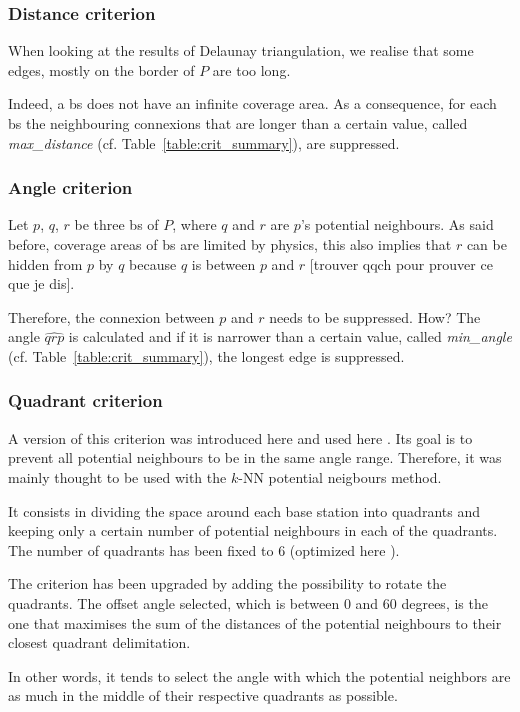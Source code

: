 \documentclass[lettersize,journal,english]{IEEEtran}
\begin{document}
\subsubsection{Distance criterion}
When looking at the results of Delaunay triangulation, we realise that some edges, mostly on the border of $P$ are too long.

Indeed, a \acrshort{bs} does not have an infinite coverage area. As a consequence, for each \acrshort{bs} the neighbouring connexions that are longer than a certain value, called \emph{max\_distance} (cf. Table~\ref{table:crit_summary}), are suppressed.

\subsubsection{Angle criterion}
Let $p$, $q$, $r$ be three \acrshort{bs} of $P$, where $q$ and $r$ are $p$'s potential neighbours. As said before, coverage areas of \acrshort{bs} are limited by physics, this also implies that $r$ can be \og hidden\fg{} from $p$ by $q$ because $q$ is between $p$ and $r$ [trouver qqch pour prouver ce que je dis].

Therefore, the connexion between $p$ and $r$ needs to be suppressed. How? The angle $\widehat{qrp}$ is calculated and if it is narrower than a certain value, called \emph{min\_angle} (cf. Table~\ref{table:crit_summary}), the longest edge is suppressed.

\subsubsection{Quadrant criterion}
A version of this criterion was introduced here \cite{10201211} and used here \cite{art_del_paq}. Its goal is
to prevent all potential neighbours to be in the same angle range. Therefore, it was mainly thought to be used with the 
$k$-NN potential neigbours method.

It consists in dividing the space around each base station into quadrants and keeping only a certain number of potential neighbours
in each of the quadrants. The number of quadrants has been fixed to 6 (optimized here \cite{art_del_paq}).

The criterion has been upgraded by adding the possibility to rotate the quadrants. The offset angle selected, which is between 0 and 
60 degrees, is the one that maximises the sum of the distances of the potential neighbours to their closest quadrant delimitation.

In other words, it tends to select the angle with which the potential neighbors are as much in the middle of their respective quadrants
as possible.
\end{document}
